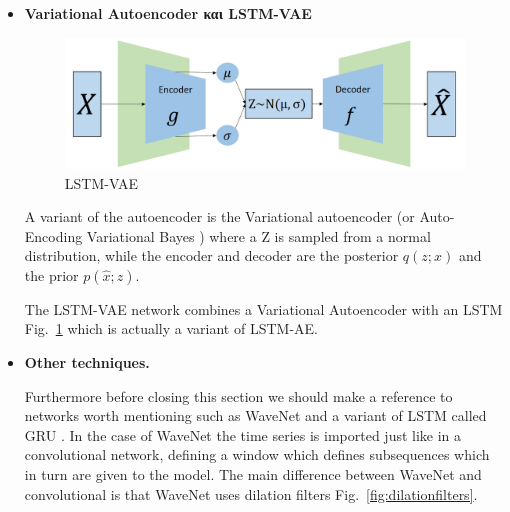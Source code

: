 \documentclass[a4paper,12pt]{report}
\theoremstyle{definitionNODot}
\begin{document}
\begin{itemize}
		\item \textbf{Variational Autoencoder και LSTM-VAE}
		
		\begin{figure}[h]
			\centering
			\includegraphics[width=\textwidth/8*7]{lstmvae.png}
			\caption{LSTM-VAE}
			\label{fig:lstmvae}
		\end{figure}
		
		A variant of the autoencoder is the Variational autoencoder (or Auto-Encoding Variational Bayes \cite{Kingma2013WellingVAE}) where a Z is sampled from a normal distribution, while the encoder and decoder are the posterior $q(z;x)$ and the prior $p(\hat{x};z)$.
		
		The LSTM-VAE network combines a Variational Autoencoder with an LSTM Fig.~\ref{fig:lstmvae} which is actually a variant of LSTM-AE.
		
		
		\item \textbf{Other techniques.}
		
		Furthermore before closing this section we should make a reference to networks worth mentioning such as WaveNet \cite{Oord2016WaveNet} and a variant of LSTM called GRU \cite{ChoMerrienboer2014GRURNN}. In the case of WaveNet the time series is imported just like in a convolutional network, defining a window which defines subsequences which in turn are given to the model. The main difference between WaveNet and convolutional is that WaveNet uses dilation filters Fig.~\ref{fig:dilationfilters}. 
		

\end{itemize}
\end{document}
